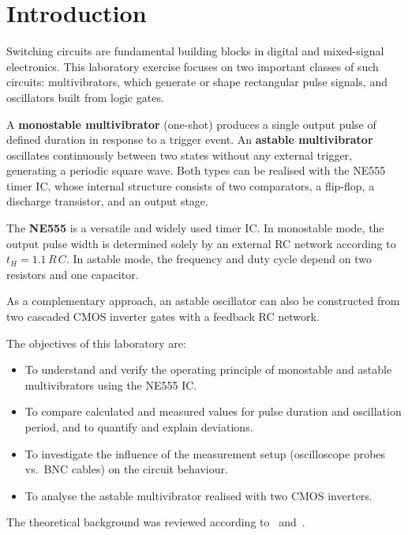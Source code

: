 \documentclass[12pt, a4paper]{article}
\begin{document}
\newpage
\tableofcontents
\newpage

\section{Introduction}

Switching circuits are fundamental building blocks in digital and mixed-signal
electronics. This laboratory exercise focuses on two important classes of such
circuits: multivibrators, which generate or shape rectangular pulse signals, and
oscillators built from logic gates.

A \textbf{monostable multivibrator} (one-shot) produces a single output pulse of
defined duration in response to a trigger event. An \textbf{astable multivibrator}
oscillates continuously between two states without any external trigger, generating
a periodic square wave. Both types can be realised with the NE555 timer IC, whose
internal structure consists of two comparators, a flip-flop, a discharge transistor,
and an output stage.

The \textbf{NE555} is a versatile and widely used timer IC. In monostable mode, the
output pulse width is determined solely by an external RC network according to
$t_H = 1.1\,R\,C$. In astable mode, the frequency and duty cycle depend on two
resistors and one capacitor.

As a complementary approach, an astable oscillator can also be constructed from two
cascaded CMOS inverter gates with a feedback RC network.

The objectives of this laboratory are:
\begin{itemize}[leftmargin=1.5em]
  \item To understand and verify the operating principle of monostable and astable
        multivibrators using the NE555 IC.
  \item To compare calculated and measured values for pulse duration and oscillation
        period, and to quantify and explain deviations.
  \item To investigate the influence of the measurement setup (oscilloscope probes
        vs.\ BNC cables) on the circuit behaviour.
  \item To analyse the astable multivibrator realised with two CMOS inverters.
\end{itemize}

The theoretical background was reviewed according to~\cite{Floyd2006}
and~\cite{TietzeSchenk1999}.
\end{document}
